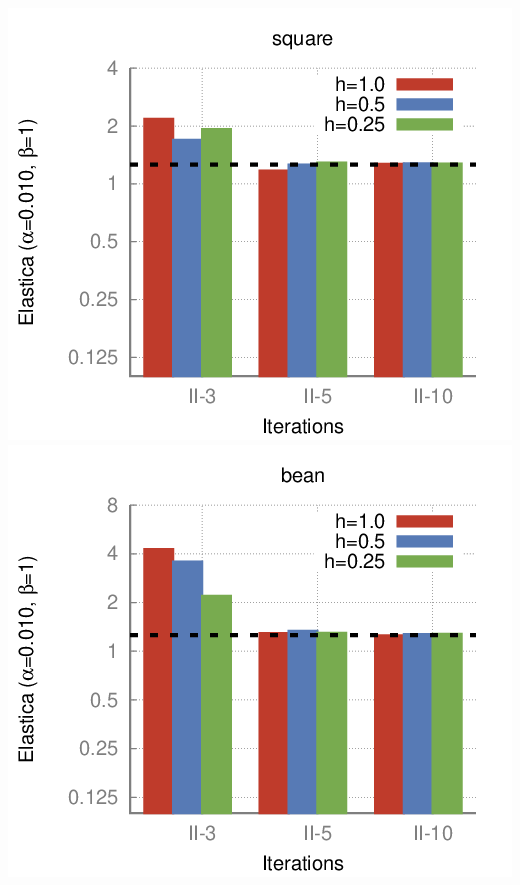 \begin{frame}
\begin{minipage}{0.49\textwidth}
\end{minipage}	
\begin{minipage}{0.49\textwidth}
\center
\includegraphics[scale=0.25]{figures/combinatorial-elastica/flow/ii/elastica/len_pen_0.01000/jonctions_1/curve_segs_4/best/gs_0.25000/square-bars.png}\\[0.6em]
\includegraphics[scale=0.25]{figures/combinatorial-elastica/flow/ii/elastica/len_pen_0.01000/jonctions_1/curve_segs_4/best/gs_0.25000/bean-bars.png}
\end{minipage}


\end{frame}
